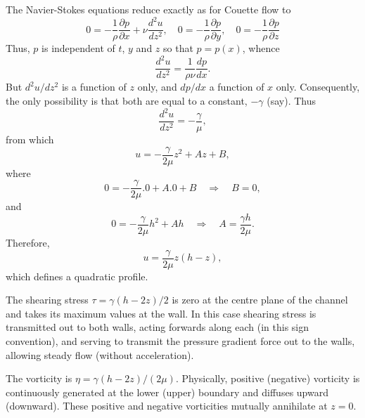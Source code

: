 \documentclass[twoside,a4paper,11pt]{report}
\begin{document}
The Navier-Stokes equations reduce exactly as for Couette flow to
\[
0=-\frac{1}{\rho }\frac{\partial p}{\partial x}+\nu 
\frac{d^2u}{dz^2},\quad 0=-\frac{1}{\rho }\frac{\partial 
p}{\partial y},\quad 0=-\frac{1}{\rho }\frac{\partial 
p}{\partial z}
\]
Thus, $p$ is independent of $t$, $y$ and $z$ so that $p = p(x)$, whence
\[
\frac{d^2u}{dz^2}=\frac{1}{\rho \nu }\frac{dp}{dx}.
\]
But ${d^2u} / {dz^2}$ is a function of $z$ only, and ${dp} / {dx}$ a function
of $x$ only. Consequently, the only possibility is that both
are equal to a constant, $-\gamma $ (say). Thus 
\[
\frac{d^2u}{dz^2}=-\frac{\gamma }{\mu },
\]
from which 
\[ u=-\frac{\gamma }{2\mu }z^2+Az+B, \]
where 
\[ 0=-\frac{\gamma }{2\mu }. 0+A. 
0+B \quad \Rightarrow \quad B=0, \]
and 
\[ 0=-\frac{\gamma }{2\mu 
}h^2+Ah \quad \Rightarrow \quad A=\frac{\gamma h}{2\mu }. \]
Therefore, 
\[ u=\frac{\gamma }{2\mu }z(h-z), \]
which defines a quadratic profile.

The shearing stress $\tau ={\gamma (h-2z)} / 2$ 
is zero at the centre plane of the channel and takes its maximum values at 
the wall. In this case shearing stress is transmitted out to both walls, 
acting forwards along each (in this sign convention), and 
serving to transmit the pressure gradient force out to the walls, 
allowing steady flow (without acceleration).

The vorticity is $\eta ={\gamma (h-2z)}  / {\left( {2\mu } \right)}$. Physically, positive 
(negative) vorticity is continuously generated at the lower (upper) boundary 
and diffuses upward (downward). These positive and negative vorticities 
mutually annihilate at $z = 0$. 
\end{document}
